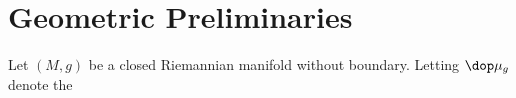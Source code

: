 \section{Geometric Preliminaries}
Let $(M,g)$ be a closed Riemannian manifold without boundary. Letting $\dop \mu_g$ denote the